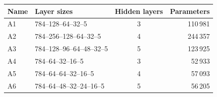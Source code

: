 \begin{tabular}{llcr}
\toprule
Name & Layer sizes & Hidden layers & Parameters \\
\midrule
A1 & 784--128--64--32--5 & 3 & 110\,981 \\
A2 & 784--256--128--64--32--5 & 4 & 244\,357 \\
A3 & 784--128--96--64--48--32--5 & 5 & 123\,925 \\
A4 & 784--64--32--16--5 & 3 & 52\,933 \\
A5 & 784--64--64--32--16--5 & 4 & 57\,093 \\
A6 & 784--64--48--32--24--16--5 & 5 & 56\,205 \\
\bottomrule
\end{tabular}
